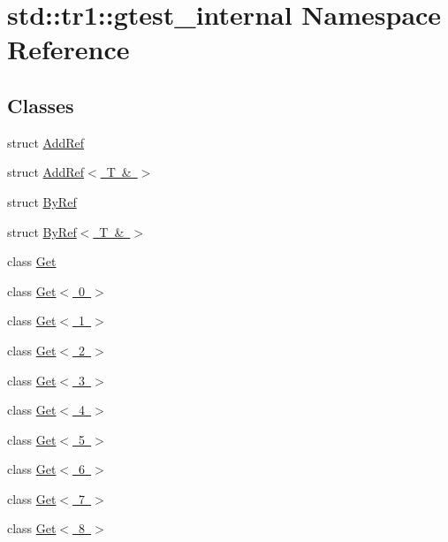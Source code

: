 \hypertarget{namespacestd_1_1tr1_1_1gtest__internal}{}\section{std\+::tr1\+::gtest\+\_\+internal Namespace Reference}
\label{namespacestd_1_1tr1_1_1gtest__internal}
\subsection*{Classes}
\begin{DoxyCompactItemize}
\item 
struct \mbox{\hyperlink{structstd_1_1tr1_1_1gtest__internal_1_1_add_ref}{Add\+Ref}}
\item 
struct \mbox{\hyperlink{structstd_1_1tr1_1_1gtest__internal_1_1_add_ref_3_01_t_01_6_01_4}{Add\+Ref$<$ T \& $>$}}
\item 
struct \mbox{\hyperlink{structstd_1_1tr1_1_1gtest__internal_1_1_by_ref}{By\+Ref}}
\item 
struct \mbox{\hyperlink{structstd_1_1tr1_1_1gtest__internal_1_1_by_ref_3_01_t_01_6_01_4}{By\+Ref$<$ T \& $>$}}
\item 
class \mbox{\hyperlink{classstd_1_1tr1_1_1gtest__internal_1_1_get}{Get}}
\item 
class \mbox{\hyperlink{classstd_1_1tr1_1_1gtest__internal_1_1_get_3_010_01_4}{Get$<$ 0 $>$}}
\item 
class \mbox{\hyperlink{classstd_1_1tr1_1_1gtest__internal_1_1_get_3_011_01_4}{Get$<$ 1 $>$}}
\item 
class \mbox{\hyperlink{classstd_1_1tr1_1_1gtest__internal_1_1_get_3_012_01_4}{Get$<$ 2 $>$}}
\item 
class \mbox{\hyperlink{classstd_1_1tr1_1_1gtest__internal_1_1_get_3_013_01_4}{Get$<$ 3 $>$}}
\item 
class \mbox{\hyperlink{classstd_1_1tr1_1_1gtest__internal_1_1_get_3_014_01_4}{Get$<$ 4 $>$}}
\item 
class \mbox{\hyperlink{classstd_1_1tr1_1_1gtest__internal_1_1_get_3_015_01_4}{Get$<$ 5 $>$}}
\item 
class \mbox{\hyperlink{classstd_1_1tr1_1_1gtest__internal_1_1_get_3_016_01_4}{Get$<$ 6 $>$}}
\item 
class \mbox{\hyperlink{classstd_1_1tr1_1_1gtest__internal_1_1_get_3_017_01_4}{Get$<$ 7 $>$}}
\item 
class \mbox{\hyperlink{classstd_1_1tr1_1_1gtest__internal_1_1_get_3_018_01_4}{Get$<$ 8 $>$}}
\item 

\end{DoxyCompactItemize}
